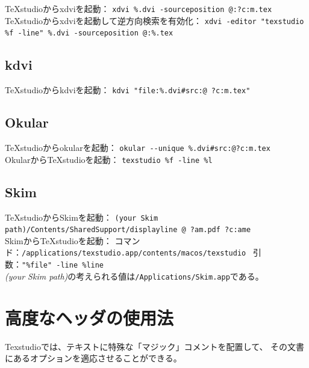 TeXstudioからxdviを起動：
 \texttt{xdvi \%.dvi -sourceposition @:?c:m.tex}\\

TeXstudioからxdviを起動して逆方向検索を有効化：
 \texttt{xdvi -editor "texstudio \%f -line" \%.dvi -sourceposition @:\%.tex}

\subsection{kdvi}

TeXstudioからkdviを起動：
 \texttt{kdvi "file:\%.dvi\#src:@ ?c:m.tex"}

\subsection{Okular}

TeXstudioからokularを起動：
 \verb+okular --unique %.dvi#src:@?c:m.tex+\\

OkularからTeXstudioを起動： \verb+texstudio %f -line %l+

\subsection{Skim}

TeXstudioからSkimを起動：
 \texttt{(your Skim path)/Contents/SharedSupport/displayline @ ?am.pdf ?c:ame}\\

SkimからTeXstudioを起動：
コマンド：\verb+/applications/texstudio.app/contents/macos/texstudio+
\ 引数：\verb+"%file" -line %line+\\

\emph{(your Skim path)}の考えられる値は\verb+/Applications/Skim.app+である。

\section{高度なヘッダの使用法}\label{sec:magiccomment}

Texstudioでは、テキストに特殊な「マジック」コメントを配置して、
その文書にあるオプションを適応させることができる。

